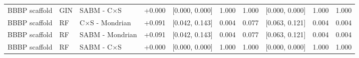 \begin{tabular}{lllrcccccc}
BBBP scaffold & GIN & SABM - C$\times$S & +0.000 & [0.000, 0.000] & 1.000 & 1.000 & [0.000, 0.000] & 1.000 & 1.000\\
BBBP scaffold & RF & C$\times$S - Mondrian & +0.091 & [0.042, 0.143] & 0.004 & 0.077 & [0.063, 0.121] & 0.004 & 0.004\\
BBBP scaffold & RF & SABM - Mondrian & +0.091 & [0.042, 0.143] & 0.004 & 0.077 & [0.063, 0.121] & 0.004 & 0.004\\
BBBP scaffold & RF & SABM - C$\times$S & +0.000 & [0.000, 0.000] & 1.000 & 1.000 & [0.000, 0.000] & 1.000 & 1.000\\
\bottomrule
\end{tabular}
